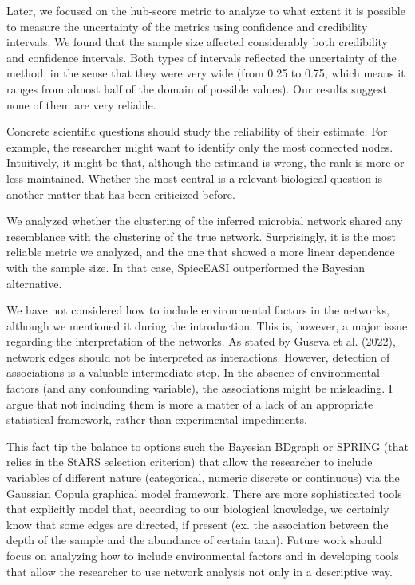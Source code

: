 \documentclass[
  a4paper,
]{article}
\begin{document}
Later, we focused on the hub-score metric to analyze to what extent it
is possible to measure the uncertainty of the metrics using confidence
and credibility intervals. We found that the sample size affected
considerably both credibility and confidence intervals. Both types of
intervals reflected the uncertainty of the method, in the sense that
they were very wide (from 0.25 to 0.75, which means it ranges from
almost half of the domain of possible values). Our results suggest none
of them are very reliable.

Concrete scientific questions should study the reliability of their
estimate. For example, the researcher might want to identify only the
most connected nodes. Intuitively, it might be that, although the
estimand is wrong, the rank is more or less maintained. Whether the most
central is a relevant biological question is another matter that has
been criticized before.

We analyzed whether the clustering of the inferred microbial network
shared any resemblance with the clustering of the true network.
Surprisingly, it is the most reliable metric we analyzed, and the one
that showed a more linear dependence with the sample size. In that case,
SpiecEASI outperformed the Bayesian alternative.

We have not considered how to include environmental factors in the
networks, although we mentioned it during the introduction. This is,
however, a major issue regarding the interpretation of the networks. As
stated by Guseva et al. (2022), network edges should not be interpreted
as interactions. However, detection of associations is a valuable
intermediate step. In the absence of environmental factors (and any
confounding variable), the associations might be misleading. I argue
that not including them is more a matter of a lack of an appropriate
statistical framework, rather than experimental impediments.

This fact tip the balance to options such the Bayesian BDgraph or SPRING
(that relies in the StARS selection criterion) that allow the researcher
to include variables of different nature (categorical, numeric discrete
or continuous) via the Gaussian Copula graphical model framework. There
are more sophisticated tools that explicitly model that, according to
our biological knowledge, we certainly know that some edges are
directed, if present (ex. the association between the depth of the
sample and the abundance of certain taxa). Future work should focus on
analyzing how to include environmental factors and in developing tools
that allow the researcher to use network analysis not only in a
descriptive way.
\end{document}
